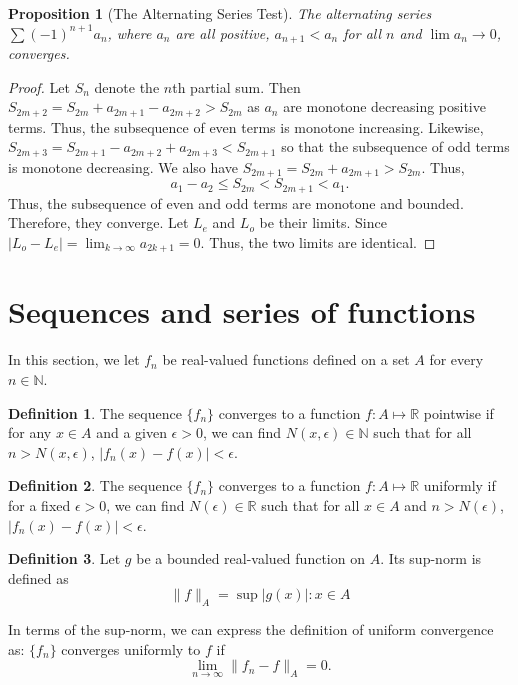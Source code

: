 \documentclass{article}
\theoremstyle{plain}
\numberwithin{thm}{section}
\theoremstyle{plain}
\newtheorem{prop}{Proposition}
\numberwithin{prop}{section}
\theoremstyle{definition}
\newtheorem{defn}{Definition}
\numberwithin{defn}{section}
\theoremstyle{remark}
\numberwithin{equation}{section}
\begin{document}
\begin{prop}[The Alternating Series Test]\label{s4p7}
The alternating series $\sum (-1)^{n+1}a_n$, where $a_n$ are all positive,
$a_{n+1} < a_n$ for all $n$ and $\lim a_n \rightarrow 0$, converges.
\end{prop}
\begin{proof}
Let $S_n$ denote the $n$th partial sum. Then $S_{2m+2} = S_{2m} + a_{2m+1} -
a_{2m+2} > S_{2m}$ as $a_n$ are monotone decreasing positive terms. Thus, the
subsequence of even terms is monotone increasing. Likewise, $S_{2m+3} = S_{2m+1}
- a_{2m+2} + a_{2m+3} < S_{2m+1}$ so that the subsequence of odd terms is
monotone decreasing. We also have $S_{2m+1} = S_{2m} + a_{2m+1} > S_{2m}$. Thus,
\[
a_1 - a_2 \le S_{2m} < S_{2m + 1} < a_1.
\]
Thus, the subsequence of even and odd terms are monotone and bounded. Therefore,
they converge. Let $L_e$ and $L_o$ be their limits. Since $|L_o - L_e| = 
\lim_{k \rightarrow \infty} a_{2k+1} = 0$. Thus, the two limits are identical.
\end{proof}

\section{Sequences and series of functions}\label{s5}
In this section, we let $f_n$ be real-valued functions defined on a set $A$ for
every $n \in \mathbb{N}$.

\begin{defn}\label{s5d1}
The sequence $\{f_n\}$ converges to a function $f: A \mapsto \mathbb{R}$ 
pointwise if for any $x \in A$ and a given $\epsilon > 0$, we can find 
$N(x, \epsilon) \in \mathbb{N}$ such that for all $n > N(x, \epsilon)$,
$|f_n(x) - f(x)| < \epsilon$.
\end{defn}

\begin{defn}\label{s5d2}
The sequence $\{f_n\}$ converges to a function $f: A \mapsto \mathbb{R}$
uniformly if for a fixed $\epsilon > 0$, we can find $N(\epsilon) \in \mathbb{R}
$ such that for all $x \in A$ and $n > N(\epsilon)$, $|f_n(x) - f(x)| < 
\epsilon$.
\end{defn}

\begin{defn}\label{s5d3}
Let $g$ be a bounded real-valued function on $A$. Its sup-norm is defined as
\[
\lVert f\rVert_A = \sup{|g(x)|: x \in A}
\]
\end{defn}

In terms of the sup-norm, we can express the definition of uniform convergence
as: $\{f_n\}$ converges uniformly to $f$ if 
\[
\lim_{n \rightarrow \infty} \lVert f_n - f \rVert_A = 0.
\]
\end{document}
